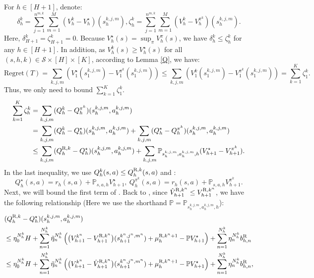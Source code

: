 \documentclass{article}
\newcommand{\R}{\textnormal{R}}
\begin{document}
For $h \in [H+1]$, denote:
$$\delta_h^k = \sum_{j=1}^{n^{m,k}}\sum_{m=1}^M\left(V_h^k - V_h^{\star}\right)(s_h^{k,j,m}),\zeta_h^k = \sum_{j=1}^{n^{m,k}}\sum_{m=1}^M\left(V_h^k - V_h^{\pi^k}\right)(s_h^{k,j,m}).$$
Here, $\delta_{H+1}^k =\zeta_{H+1}^k = 0$. Because $V_h^{\star}(s)=\sup _\pi V_h^\pi(s)$, we have $\delta_h^k \leq \zeta_h^k$ for any $h \in [H+1]$. In addition, as $V_h^k(s)\geq V_h^{\star}(s)$ for all $(s,h,k)\in \mathcal{S}\times [H]\times [K]$, according to Lemma \ref{Q}, we have:
\begin{equation*}
    \mbox{Regret}(T) = \sum_{k,j,m}\left(V_1^\star(s_1^{k,j,m}) - V_1^{\pi^{k}}(s_1^{k,j,m})\right) \leq \sum_{k,j,m}\left(V_1^k(s_1^{k,j,m}) - V_1^{\pi^{k}} (s_1^{k,j,m})\right) = \sum_{k=1}^K \zeta_1^k.
\end{equation*}
Thus, we only need to bound $\sum_{k=1}^K \zeta_1^k$.
\begin{align}
\label{recurbegin}
    \sum_{k=1}^K \zeta_h^k &= \sum_{k,j,m} (Q_h^k - Q_h^{\pi^k})(s_h^{k,j,m}, a_h^{k,j,m}) \nonumber\\
    &= \sum_{k,j,m} (Q_h^k - Q_h^{\star})(s_h^{k,j,m}, a_h^{k,j,m}) + \sum_{k,j,m} (Q_h^{\star} - Q_h^{\pi^k})(s_h^{k,j,m}, a_h^{k,j,m}) \nonumber\\
    &\leq \sum_{k,j,m} (Q_h^{\R,k} - Q_h^{\star})(s_h^{k,j,m}, a_h^{k,j,m}) + \sum_{k,j,m}\mathbb{P}_{s_h^{k,j,m}, a_h^{k,j,m},h}(V_{h+1}^{\star} - V_{h+1}^{\pi^k}).
\end{align}
In the last inequality, we use $Q_h^k(s,a) \leq Q_h^{\R,k}(s,a)$ and :
\begin{equation*}
        Q_h^{\star}(s, a) = r_h(s, a) + \mathbb{P}_{s,a,h} V_{h+1}^{\star},\ Q_h^{\pi^k}(s, a) = r_h(s, a) + \mathbb{P}_{s,a,h} V_{h+1}^{\pi^k}.
    \end{equation*}
Next, we will bound the first term of . Back to , since $\hat{V}_{h+1}^{\R,k^n} \leq V_{h+1}^{\R,k^n}$, we have the following relationship (Here we use the shorthand $\mathbb{P} = \mathbb{P}_{s_h^{k,j,m}, a_h^{k,j,m},h}$):
\begin{align}
\label{R-stardiff}
        &(Q_h^{\R,k} - Q_h^{\star})(s_h^{k,j,m}, a_h^{k,j,m}) \nonumber\\
        &\leq \eta_0^{N_h^k}H + \sum_{n=1}^{N_h^k} \Tilde{\eta}_n^{N_h^k} \left( \big(V_{h+1}^{k^n}-V_{h+1}^{\R,k^n}\big)(s_{h+1}^{k^n,j^n,m^n})   + \mu_h^{\R,k^n+1}- \mathbb{P}V_{h+1}^{\star}\right) + \sum_{n=1}^{N_h^k} \eta_n^{N_h^k}b_{h,n}^{\R} \nonumber\\
        &\leq \eta_0^{N_h^k}H + \sum_{n=1}^{N_h^k} \Tilde{\eta}_n^{N_h^k} \left( \big(V_{h+1}^{k^n}-\hat{V}_{h+1}^{\R,k^n}\big)(s_{h+1}^{k^n,j^n,m^n})   + \mu_h^{\R,k^n+1}- \mathbb{P}V_{h+1}^{\star}\right) + \sum_{n=1}^{N_h^k} \eta_n^{N_h^k}b_{h,n}^{\R},
    \end{align}
\end{document}
